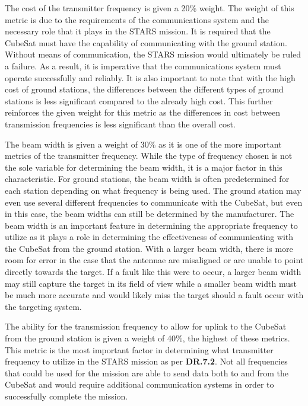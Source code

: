 The cost of the transmitter frequency is given a 20\% weight. The weight of this metric is due to the requirements of the communications system and the necessary role that it plays in the STARS mission. It is required that the CubeSat must have the capability of communicating with the ground station. Without means of communication, the STARS mission would ultimately be ruled a failure. As a result, it is imperative that the communications system must operate successfully and reliably. It is also important to note that with the high cost of ground stations, the differences between the different types of ground stations is less significant compared to the already high cost. This further reinforces the given weight for this metric as the differences in cost between transmission frequencies is less significant than the overall cost. 

The beam width is given a weight of 30\% as it is one of the more important metrics of the transmitter frequency. While the type of frequency chosen is not the sole variable for determining the beam width, it is a major factor in this characteristic. For ground stations, the beam width is often predetermined for each station depending on what frequency is being used. The ground station may even use several different frequencies to communicate with the CubeSat, but even in this case, the beam widths can still be determined by the manufacturer. The beam width is an important feature in determining the appropriate frequency to utilize as it plays a role in determining the effectiveness of communicating with the CubeSat from the ground station. With a larger beam width, there is more room for error in the case that the antennae are misaligned or are unable to point directly towards the target. If a fault like this were to occur, a larger beam width may still capture the target in its field of view while a smaller beam width must be much more accurate and would likely miss the target should a fault occur with the targeting system. 

The ability for the transmission frequency to allow for uplink to the CubeSat from the ground station is given a weight of 40\%, the highest of these metrics. This metric is the most important factor in determining what transmitter frequency to utilize in the STARS mission as per \textbf{DR.7.2}. Not all frequencies that could be used for the mission are able to send data both to and from the CubeSat and would require additional communication systems in order to successfully complete the mission. 


